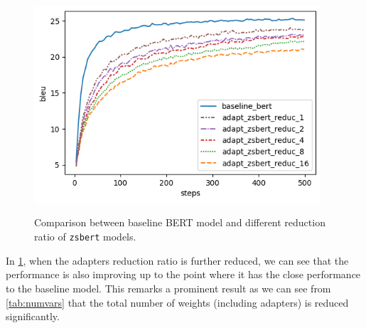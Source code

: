 \begin{figure}[]
    {\includegraphics[width=0.95\textwidth]{img/adapter_zsbert_ratio.png}}
    \centering
    \caption{Comparison between baseline BERT model and different reduction ratio of \texttt{zsbert} models.}
    \label{img:adapter_zsbert_ratio}
\end{figure}

In \cref{img:adapter_zsbert_ratio}, when the adapters reduction ratio is further reduced, we can see that the performance is also improving up to the point where it has the close performance to the baseline model. This remarks a prominent result as we can see from \cref{tab:numvars} that the total number of weights (including adapters) is reduced significantly.

